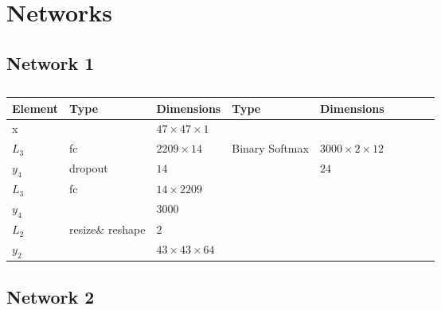 \appendix
\chapter{Networks} \label{appendix1}
\section*{Network 1} \label{net:0}

\begin{table}[h!]
\centering
{\footnotesize
\begin{tabular}{|lllllllll|}
\hline
\multicolumn{1}{|l|}{Element} & Type     & \multicolumn{1}{l|}{Dimensions}                     & Type     & \multicolumn{1}{l|}{Dimensions}  \\ \hline
\multicolumn{1}{|l|}{x}       &          & \multicolumn{1}{l|}{$47\times47\times1$}            &          & \multicolumn{1}{l|}{}        \\ \hline
\multicolumn{1}{|l|}{$L_3$}   & fc       & \multicolumn{1}{l|}{$2209\times14$}              & Binary Softmax & \multicolumn{1}{l|}{$3000\times2\times12$}        \\
\multicolumn{1}{|l|}{$y_4$}   & dropout  & \multicolumn{1}{l|}{$14$}                         &          & \multicolumn{1}{l|}{$24$}        \\ \hline
\multicolumn{1}{|l|}{$L_3$}   & fc       & \multicolumn{1}{l|}{$14\times2209$}              &          & \multicolumn{1}{l|}{}        \\
\multicolumn{1}{|l|}{$y_4$}   &          & \multicolumn{1}{l|}{$3000$}                         &          & \multicolumn{1}{l|}{}        \\ \hline
\multicolumn{1}{|l|}{$L_2$}   & resize\& reshape & \multicolumn{1}{l|}{$2$}                    &          & \multicolumn{1}{l|}{}        \\
\multicolumn{1}{|l|}{$y_2$}   &          & \multicolumn{1}{l|}{$43\times43\times 64$}          &          & \multicolumn{1}{l|}{}        \\ \hline
\end{tabular}

\caption{}

}
\end{table}

\section*{Network 2} \label{net:1}


